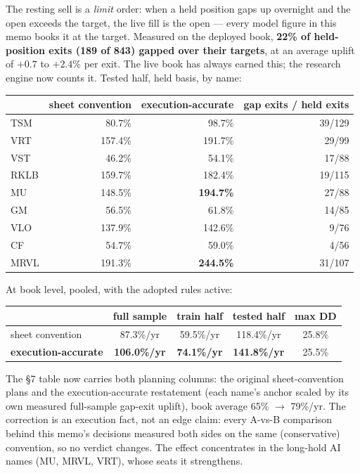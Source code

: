 \documentclass[11pt,a4paper]{article}
\newcommand{\tabnote}[1]{\begin{center}\begin{minipage}{0.92\textwidth}
  \footnotesize\color{bcgrey}#1\end{minipage}\end{center}}
\begin{document}
The resting sell is a \emph{limit} order: when a held position gaps up
overnight and the open exceeds the target, the live fill is the open --- every
model figure in this memo books it at the target. Measured on the deployed
book, \textbf{22\% of held-position exits (189 of 843) gapped over their
targets}, at an average uplift of $+0.7$ to $+2.4\%$ per exit. The live book
has always earned this; the research engine now counts it. Tested half, held
basis, by name:

\begin{center}
\begin{tabular}{lrrr}
\toprule
 & sheet convention & execution-accurate & gap exits / held exits \\
\midrule
TSM  &  80.7\% &  98.7\% & 39/129 \\
VRT  & 157.4\% & 191.7\% & 29/99 \\
VST  &  46.2\% &  54.1\% & 17/88 \\
RKLB & 159.7\% & 182.4\% & 19/115 \\
MU   & 148.5\% & \textbf{194.7\%} & 27/88 \\
GM   &  56.5\% &  61.8\% & 14/85 \\
VLO  & 137.9\% & 142.6\% & 9/76 \\
CF   &  54.7\% &  59.0\% & 4/56 \\
MRVL & 191.3\% & \textbf{244.5\%} & 31/107 \\
\bottomrule
\end{tabular}
\end{center}

At book level, pooled, with the adopted rules active:

\begin{center}
\begin{tabular}{lcccc}
\toprule
 & full sample & train half & tested half & max DD \\
\midrule
sheet convention        & 87.3\%/yr & 59.5\%/yr & 118.4\%/yr & 25.8\% \\
\textbf{execution-accurate} & \textbf{106.0\%/yr} & \textbf{74.1\%/yr} & \textbf{141.8\%/yr} & 25.5\% \\
\bottomrule
\end{tabular}
\end{center}

\tabnote{The \S7 table now carries both planning columns: the original
sheet-convention plans and the execution-accurate restatement (each name's
anchor scaled by its own measured full-sample gap-exit uplift), book average
65\% $\to$ 79\%/yr. The correction is an execution fact, not an edge claim:
every A-vs-B comparison behind this memo's decisions measured both sides on the
same (conservative) convention, so no verdict changes. The effect concentrates
in the long-hold AI names (MU, MRVL, VRT), whose seats it strengthens.}
\end{document}
